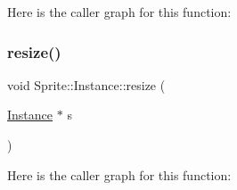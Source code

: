 Here is the caller graph for this function\+:
\mbox{\label{namespace_sprite_1_1_instance_a67cbda93595d925fc895a2af32de5fe9}} 
\subsubsection{\texorpdfstring{resize()}{resize()}}
{\footnotesize\ttfamily void Sprite\+::\+Instance\+::resize (\begin{DoxyParamCaption}\item[{\mbox{\hyperlink{struct_sprite_1_1_instance_1_1_instance}{Instance}} $\ast$}]{s }\end{DoxyParamCaption})}

Here is the caller graph for this function\+:
